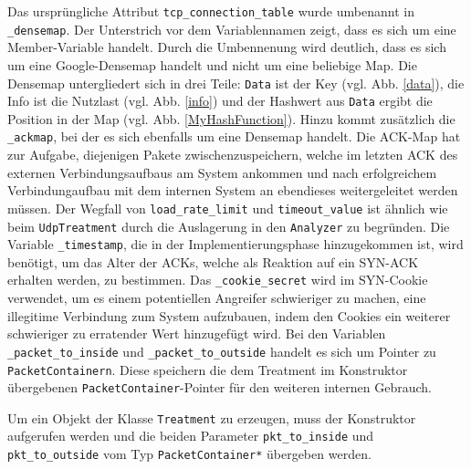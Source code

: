 \documentclass[../review_2.tex]{subfiles}
\begin{document}
Das ursprüngliche Attribut \texttt{tcp\_connection\_table} wurde umbenannt in \texttt{\_densemap}. Der Unterstrich vor dem Variablennamen zeigt, dass es sich um eine Member-Variable handelt. Durch die Umbennenung wird  deutlich, dass es sich um eine Google-Densemap handelt und nicht um eine beliebige Map. Die Densemap untergliedert sich in drei Teile: \texttt{Data} ist der Key (vgl. Abb. \ref{data}), die Info ist die Nutzlast (vgl. Abb. \ref{info})  und der Hashwert aus \texttt{Data} ergibt die Position in der Map (vgl. Abb. \ref{MyHashFunction}).
Hinzu kommt zusätzlich die \texttt{\_ackmap}, bei der es sich ebenfalls um eine Densemap handelt. Die ACK-Map hat zur Aufgabe, diejenigen Pakete zwischenzuspeichern, welche im letzten ACK des externen Verbindungsaufbaus am System ankommen und nach erfolgreichem Verbindungaufbau mit dem internen System an ebendieses weitergeleitet werden müssen.
Der Wegfall von \texttt{load\_rate\_limit} und \texttt{timeout\_value} ist ähnlich wie beim \texttt{UdpTreatment} durch die Auslagerung in den \texttt{Analyzer} zu begründen.
Die Variable \texttt{\_timestamp}, die in der Implementierungsphase hinzugekommen ist, wird benötigt, um das Alter der ACKs, welche als Reaktion auf ein SYN-ACK erhalten werden, zu bestimmen.
Das \texttt{\_cookie\_secret} wird im SYN-Cookie verwendet, um es einem potentiellen Angreifer schwieriger zu machen, eine illegitime Verbindung zum System aufzubauen, indem den Cookies ein weiterer schwieriger zu erratender Wert hinzugefügt wird.
Bei den Variablen \texttt{\_packet\_to\_inside} und \texttt{\_packet\_to\_outside} handelt es sich um Pointer zu \texttt{PacketContainern}. Diese speichern die dem Treatment im Konstruktor übergebenen \texttt{PacketContainer}-Pointer für den weiteren internen Gebrauch.

Um ein Objekt der Klasse \texttt{Treatment} zu erzeugen, muss der Konstruktor aufgerufen werden und die beiden Parameter \texttt{pkt\_to\_inside} und \texttt{pkt\_to\_outside} vom Typ \texttt{PacketContainer*} übergeben werden.
\end{document}
